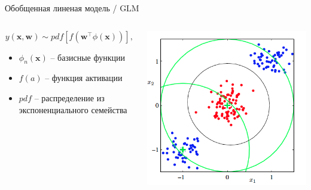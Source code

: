 \documentclass[aspectratio=169]{beamer}
\begin{document}
\begin{frame}{Обобщенная линеная модель / GLM}

\begin{columns}[T]
    \begin{column}{.5\textwidth}
    \vspace{2em} 
\[
y(\mathbf{x}, \mathbf{w}) \sim pdf\left[ f(\mathbf{w}^\top \phi(\mathbf{x})) \right],
\]
\begin{itemize}
\item $\phi_n(\mathbf{x})$ -- базисные функции
\item $f(a)$ -- функция активации
\item $pdf$ -- распределение из экспоненциального семейства
\end{itemize}

    \end{column}
       
    \begin{column}{.5\textwidth}
    \vspace{-2em}
	\begin{center}
   		\includegraphics[scale=0.25]{images/nl.png}
   		

\end{center}
\end{column}
\end{columns}
\end{frame}
\end{document}
